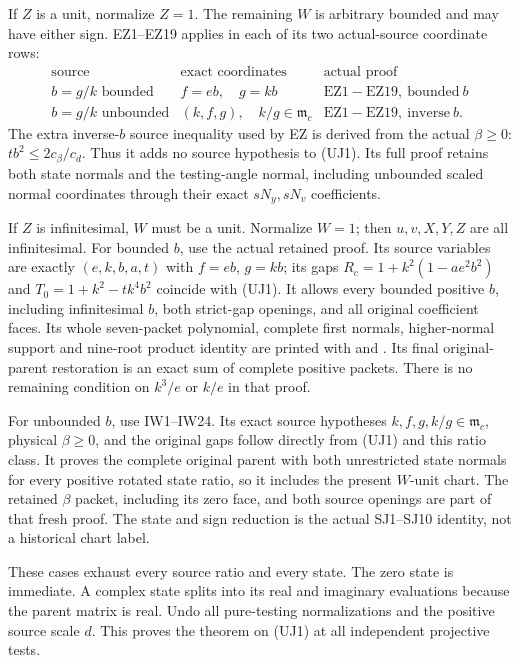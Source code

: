 If $Z$ is a unit, normalize $Z=1$. The remaining $W$ is arbitrary
bounded and may have either sign. EZ1--EZ19 applies in each of
its two actual-source coordinate rows:
\[
\begin{array}{c|c|c}
 \text{source}&\text{exact coordinates}&\text{actual proof}\\ \hline
 b=g/k\text{ bounded}& f=eb,\quad g=kb&
                     \mathrm{EZ1\!-\!EZ19,\ bounded\ }b\\
 b=g/k\text{ unbounded}&
        (k,f,g),\quad k/g\in\mathfrak m_c&
                     \mathrm{EZ1\!-\!EZ19,\ inverse\ }b.
\end{array}                                                     \tag{UJ5}
\]
The extra inverse-$b$ source inequality used by EZ is derived from
the actual $\beta\geq0$: $tb^2\leq2c_\beta/c_d$. Thus it adds no
source hypothesis to (UJ1). Its full proof retains both state
normals and the testing-angle normal, including unbounded scaled
normal coordinates through their exact $sN_y,sN_v$ coefficients.

If $Z$ is infinitesimal, $W$ must be a unit. Normalize $W=1$;
then $u,v,X,Y,Z$ are all infinitesimal.
For bounded $b$, use the actual retained
 proof. Its source variables are exactly
$(e,k,b,a,t)$ with $f=eb$, $g=kb$; its gaps
$R_c=1+k^2(1-ae^2b^2)$ and
$T_0=1+k^2-tk^4b^2$ coincide with (UJ1).
It allows every bounded positive $b$, including infinitesimal $b$,
both strict-gap openings, and all original coefficient faces.
Its whole seven-packet polynomial, complete first normals,
higher-normal support and nine-root product identity are printed
with  and
. Its final original-parent
restoration is an exact sum of complete positive packets.
There is no remaining condition on $k^3/e$ or $k/e$ in that proof.

For unbounded $b$, use IW1--IW24. Its exact source hypotheses
$k,f,g,k/g\in\mathfrak m_c$, physical $\beta\geq0$, and the
original gaps follow directly from (UJ1) and this ratio class.
It proves the complete original parent with both unrestricted
state normals for every positive rotated state ratio, so it
includes the present $W$-unit chart. The retained $\beta$ packet,
including its zero face, and both source openings are part of
that fresh proof. The state and sign reduction is the actual
SJ1--SJ10 identity, not a historical chart label.

These cases exhaust every source ratio and every state.
The zero state is immediate. A complex state splits into its
real and imaginary evaluations because the parent matrix is real.
Undo all pure-testing normalizations and the positive source
scale $d$. This proves the theorem on (UJ1) at all independent
projective tests.

